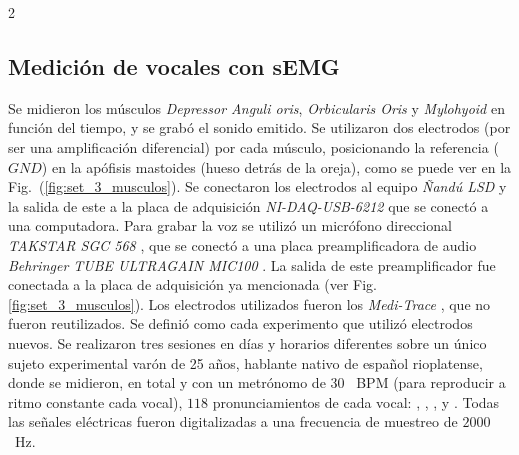 \documentclass[11pt, letterpaper]{article}
\begin{document}
\begin{multicols*}{2}

\subsection{Medición de vocales con sEMG}

Se midieron los músculos \textit{Depressor Anguli oris}, \textit{Orbicularis Oris} y \textit{Mylohyoid} en función del tiempo, y se grabó el sonido emitido. Se utilizaron dos electrodos (por ser una amplificación diferencial) por cada músculo, posicionando la referencia ($GND$) en la apófisis mastoides (hueso detrás de la oreja), como se puede ver en la Fig.~(\ref{fig:set_3_musculos}). Se conectaron los electrodos al equipo \textit{Ñandú LSD} y la salida de este a la placa de adquisición \textit{NI-DAQ-USB-6212} \cite{ni6212} que se conectó a una computadora. Para grabar la voz se utilizó un micrófono direccional \textit{TAKSTAR SGC 568} \cite{takstar_sgc568}, que se conectó a una placa preamplificadora de audio \textit{Behringer TUBE ULTRAGAIN MIC100} \cite{behringer_mic100}. La salida de este preamplificador fue conectada a la placa de adquisición ya mencionada (ver Fig. \ref{fig:set_3_musculos}). Los electrodos utilizados fueron los \textit{Medi-Trace} \cite{kendall_530}, que no fueron reutilizados. Se definió como  cada experimento que utilizó electrodos nuevos. Se realizaron tres sesiones en días y horarios diferentes sobre un único sujeto experimental varón de 25 años, hablante nativo de español rioplatense, donde se midieron, en total y con un metrónomo de 30 ~BPM (para reproducir a ritmo constante cada vocal), $118$ pronunciamientos de cada vocal: , , ,  y . Todas las señales eléctricas fueron digitalizadas a una frecuencia de muestreo de $2000$~Hz.


\end{multicols*}
\end{document}
